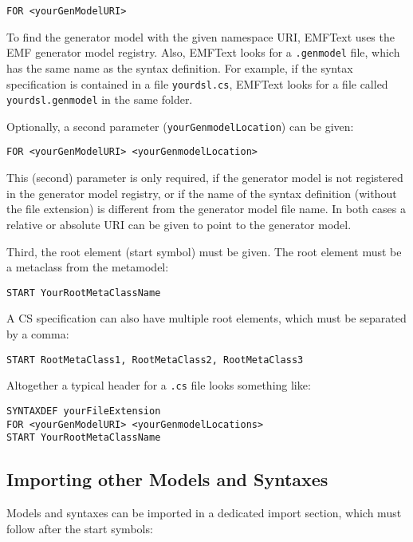 \begin{lstlisting}
FOR <yourGenModelURI>
\end{lstlisting}

To find the generator model with the given namespace URI, EMFText uses the EMF
generator model registry. Also, EMFText looks for a \texttt{.genmodel} file,
which has the same name as the syntax definition. For example, if the syntax 
specification is contained in a file \texttt{yourdsl.cs}, EMFText looks for a
file called \texttt{yourdsl.genmodel} in the same folder.

Optionally, a second parameter (\texttt{yourGenmodelLocation}) can be given: 

\begin{lstlisting}
FOR <yourGenModelURI> <yourGenmodelLocation>
\end{lstlisting}

This (second) parameter is only required, if the generator model is not
registered in the generator model registry, or if the name of the syntax 
definition (without the file extension) is different from the
generator model file name. In both cases a relative or absolute URI can be given
to point to the generator model.
 
Third, the root element (start symbol) must be given. The root element must be
a metaclass from the metamodel:

\begin{lstlisting}
START YourRootMetaClassName
\end{lstlisting}

A CS specification can also have multiple root elements, which must be separated
by a comma:

\begin{lstlisting}
START RootMetaClass1, RootMetaClass2, RootMetaClass3
\end{lstlisting}

Altogether a typical header for a \texttt{.cs} file looks something like:

\begin{lstlisting}
SYNTAXDEF yourFileExtension
FOR <yourGenModelURI> <yourGenmodelLocations>
START YourRootMetaClassName
\end{lstlisting} 

\subsection{Importing other Models and Syntaxes}

Models and syntaxes can be imported in a dedicated import section, which must
follow after the start symbols:

